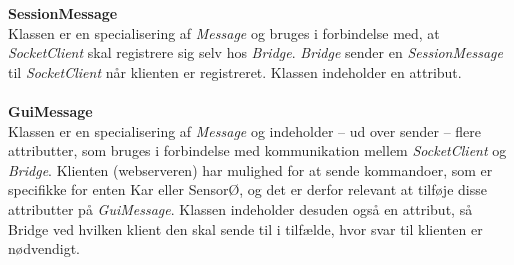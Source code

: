 \textbf{SessionMessage}\\
Klassen er en specialisering af \textit{Message} og bruges i forbindelse med, at \textit{SocketClient} skal registrere sig selv hos \textit{Bridge}. \textit{Bridge} sender en \textit{SessionMessage} til \textit{SocketClient} når klienten er registreret. Klassen indeholder en  attribut.\\\\

\textbf{GuiMessage}\\
Klassen er en specialisering af \textit{Message} og indeholder – ud over sender – flere attributter, som bruges i forbindelse med kommunikation mellem \textit{SocketClient} og \textit{Bridge}. Klienten (webserveren) har mulighed for at sende kommandoer, som er specifikke for enten Kar eller SensorØ, og det er derfor relevant at tilføje disse attributter på \textit{GuiMessage}. Klassen indeholder desuden også en  attribut, så Bridge ved hvilken klient den skal sende til i tilfælde, hvor svar til klienten er nødvendigt.
